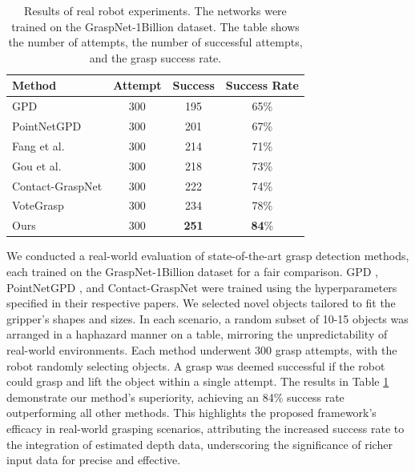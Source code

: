 \begin{table}[h!]
\caption{Results of real robot experiments. The networks were trained on the GraspNet-1Billion dataset. The table shows the number of attempts, the number of successful attempts, and the grasp success rate.}
\label{tab:real_grasping}
\begin{center}
\begin{tabular}{|l|c|c|c|}
\hline
Method & Attempt & Success & Success Rate \\
\hline
GPD \cite{ten2017grasp} & 300 & 195 & 65\% \\
PointNetGPD \cite{liang2019pointnetgpd} & 300 & 201 & 67\% \\
Fang et al. \cite{fang2020graspnet} & 300 & 214 & 71\% \\
Gou et al. \cite{gou2021rgb} & 300 & 218 & 73\% \\
Contact-GraspNet \cite{sundermeyer2021contact}  & 300 & 222 & 74\% \\
VoteGrasp \cite{hoang2022context} & 300 & 234 & 78\% \\
Ours & 300 & \textbf{251} & \textbf{84}\% \\
\hline
\end{tabular}
\end{center}
\end{table}

We conducted a real-world evaluation of state-of-the-art grasp detection methods, each trained on the GraspNet-1Billion dataset for a fair comparison. GPD \cite{ten2017grasp}, PointNetGPD \cite{liang2019pointnetgpd}, and Contact-GraspNet \cite{sundermeyer2021contact} were trained using the hyperparameters specified in their respective papers. We selected novel objects tailored to fit the gripper's shapes and sizes. In each scenario, a random subset of 10-15 objects was arranged in a haphazard manner on a table, mirroring the unpredictability of real-world environments. Each method underwent 300 grasp attempts, with the robot randomly selecting objects. A grasp was deemed successful if the robot could grasp and lift the object within a single attempt. The results in Table \ref{tab:real_grasping} demonstrate our method's superiority, achieving an 84\% success rate outperforming all other methods. This highlights the proposed framework's efficacy in real-world grasping scenarios, attributing the increased success rate to the integration of estimated depth data, underscoring the significance of richer input data for precise and effective.  \\

